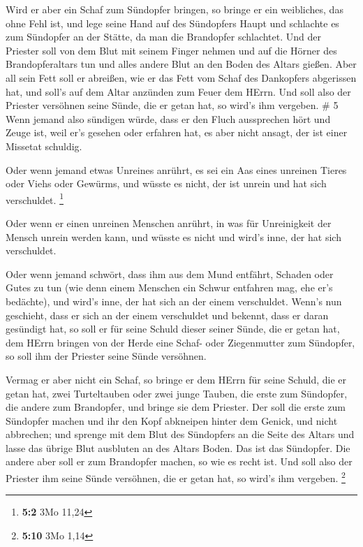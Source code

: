  Wird er aber ein Schaf zum Sündopfer bringen, so bringe er
ein weibliches, das ohne Fehl ist,  und lege seine Hand auf
des Sündopfers Haupt und schlachte es zum Sündopfer an der Stätte, da
man die Brandopfer schlachtet.  Und der Priester soll von
dem Blut mit seinem Finger nehmen und auf die Hörner des
Brandopferaltars tun und alles andere Blut an den Boden des Altars
gießen.  Aber all sein Fett soll er abreißen, wie er das
Fett vom Schaf des Dankopfers abgerissen hat, und soll's auf dem Altar
anzünden zum Feuer dem HErrn. Und soll also der Priester versöhnen seine
Sünde, die er getan hat, so wird's ihm vergeben. \# 5  Wenn
jemand also sündigen würde, dass er den Fluch aussprechen hört und Zeuge
ist, weil er's gesehen oder erfahren hat, es aber nicht ansagt, der ist
einer Missetat schuldig.

 Oder wenn jemand etwas Unreines anrührt, es sei ein Aas
eines unreinen Tieres oder Viehs oder Gewürms, und wüsste es nicht, der
ist unrein und hat sich verschuldet. \footnote{\textbf{5:2} 3Mo 11,24}

 Oder wenn er einen unreinen Menschen anrührt, in was für
Unreinigkeit der Mensch unrein werden kann, und wüsste es nicht und
wird's inne, der hat sich verschuldet.

 Oder wenn jemand schwört, dass ihm aus dem Mund entfährt,
Schaden oder Gutes zu tun (wie denn einem Menschen ein Schwur entfahren
mag, ehe er's bedächte), und wird's inne, der hat sich an der einem
verschuldet.  Wenn's nun geschieht, dass er sich an der
einem verschuldet und bekennt, dass er daran gesündigt hat, 
so soll er für seine Schuld dieser seiner Sünde, die er getan hat, dem
HErrn bringen von der Herde eine Schaf- oder Ziegenmutter zum Sündopfer,
so soll ihm der Priester seine Sünde versöhnen.

 Vermag er aber nicht ein Schaf, so bringe er dem HErrn für
seine Schuld, die er getan hat, zwei Turteltauben oder zwei junge
Tauben, die erste zum Sündopfer, die andere zum Brandopfer, 
und bringe sie dem Priester. Der soll die erste zum Sündopfer machen und
ihr den Kopf abkneipen hinter dem Genick, und nicht abbrechen;
 und sprenge mit dem Blut des Sündopfers an die Seite des
Altars und lasse das übrige Blut ausbluten an des Altars Boden. Das ist
das Sündopfer.  Die andere aber soll er zum Brandopfer
machen, so wie es recht ist. Und soll also der Priester ihm seine Sünde
versöhnen, die er getan hat, so wird's ihm vergeben. \footnote{\textbf{5:10}
  3Mo 1,14}

